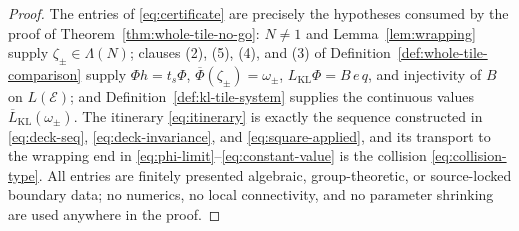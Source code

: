 \documentclass[11pt,reqno]{amsart}
\theoremstyle{definition}
\theoremstyle{remark}
\begin{document}
\begin{proof}
The entries of \eqref{eq:certificate} are precisely the hypotheses consumed by the proof of Theorem~\ref{thm:whole-tile-no-go}: \(N\ne1\) and Lemma~\ref{lem:wrapping} supply \(\zeta_\pm\in\Lambda(N)\); clauses (2), (5), (4), and (3) of Definition~\ref{def:whole-tile-comparison} supply \(\Phi h=t_s\Phi\), \(\overline\Phi(\zeta_\pm)=\omega_\pm\), \(L_{\mathrm{KL}}\Phi=B\,e\,q\), and injectivity of \(B\) on \(L(\mathcal E)\); and Definition~\ref{def:kl-tile-system} supplies the continuous values \(\overline L_{\mathrm{KL}}(\omega_\pm)\).  The itinerary \eqref{eq:itinerary} is exactly the sequence constructed in \eqref{eq:deck-seq}, \eqref{eq:deck-invariance}, and \eqref{eq:square-applied}, and its transport to the wrapping end in \eqref{eq:phi-limit}--\eqref{eq:constant-value} is the collision \eqref{eq:collision-type}.  All entries are finitely presented algebraic, group-theoretic, or source-locked boundary data; no numerics, no local connectivity, and no parameter shrinking are used anywhere in the proof.
\end{proof}
\end{document}
